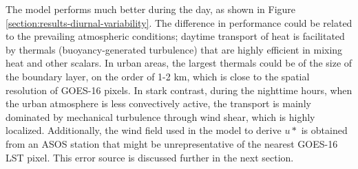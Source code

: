 The model performs much better during the day, as shown in Figure  \ref{section:results-diurnal-variability}. The difference in performance could be related to the prevailing atmospheric conditions; daytime transport of heat is facilitated by thermals (buoyancy-generated turbulence) that are highly efficient in mixing heat and other scalars. In urban areas, the largest thermals could be of the size of the boundary layer, on the order of 1-2 km, which is close to the spatial resolution of GOES-16 pixels. In stark contrast, during the nighttime hours, when the urban atmosphere is less convectively active, the transport is mainly dominated by mechanical turbulence through wind shear, which is highly localized. Additionally, the wind field used in the model to derive $u*$ is obtained from an ASOS station that might be unrepresentative of the nearest GOES-16 LST pixel. This error source is discussed further in the next section.

